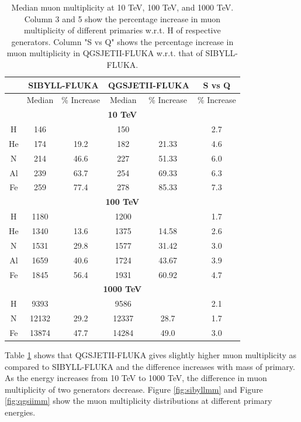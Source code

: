 \documentclass[12pt]{article}
\begin{document}
\begin{table}
\centering
\begin{tabular}{ | c | c | c | c | c | c |} 
\hline
& \multicolumn{2}{|c|}{\textbf{SIBYLL-FLUKA}} & \multicolumn{2}{|c|}{\textbf{QGSJETII-FLUKA}} & S vs Q \\
\hline
 & Median & \% Increase & Median & \% Increase & \% Increase \\
\hline 
\multicolumn{6}{|c|}{\textbf{10 TeV}} \\
\hline
H 	&	146	&	      & 150 &			& 2.7 \\
\hline
He 	&	174 &	19.2 &	182	&	21.33	&	4.6	\\
\hline
N 	& 	214 & 	46.6 &	227	&	51.33	&6.0	\\
\hline
Al 	& 	239 & 	63.7 &	254	&	69.33	&6.3	\\
\hline
Fe 	& 	259 & 	77.4 &	278	&	85.33	&7.3	\\
\hline
\multicolumn{6}{|c|}{\textbf{100 TeV}} \\
\hline
H & 1180 &  & 1200 & & 1.7 \\
\hline
He & 1340 & 13.6  & 1375 & 14.58	& 2.6\\
\hline
N & 1531 & 29.8 & 1577 & 31.42 	& 3.0\\
\hline
Al & 1659 & 40.6 & 1724 & 43.67 	& 3.9\\
\hline
Fe & 1845 & 56.4 & 1931 & 60.92	& 4.7\\
\hline
\multicolumn{6}{|c|}{\textbf{1000 TeV}} \\
\hline
H & 9393 &  & 9586 & & 2.1\\
\hline
N & 12132 & 29.2 & 12337 & 28.7 & 1.7\\
\hline
Fe & 13874 & 47.7 & 14284 & 49.0 & 3.0\\
\hline
\end{tabular}
\caption{Median muon multiplicity at 10 TeV, 100 TeV, and 1000 TeV. Column 3 and 5 show the percentage increase in muon multiplicity of different primaries w.r.t. H of respective generators. Column "S vs Q" shows the percentage increase in muon multiplicity in QGSJETII-FLUKA w.r.t. that of SIBYLL-FLUKA.\label{tab:muon_multiplicity}}
\end{table}

Table \ref{tab:muon_multiplicity} shows that QGSJETII-FLUKA gives slightly higher muon multiplicity as compared to SIBYLL-FLUKA and the difference increases with mass of primary. As the energy increases from 10 TeV to 1000 TeV, the difference in muon multiplicity of two generators decrease. Figure \ref{fig:sibyllmm} and Figure \ref{fig:qgsiimm} show the muon multiplicity distributions  at different primary energies.
\end{document}
